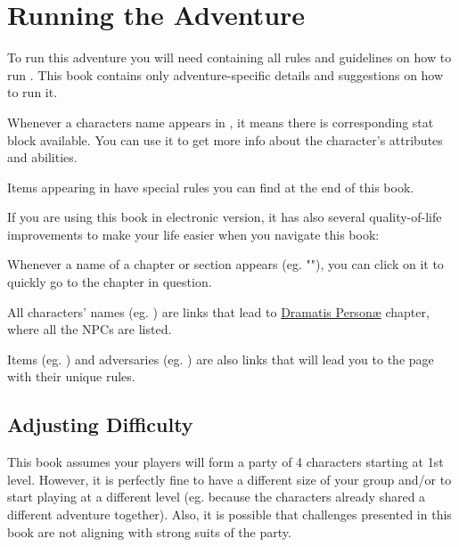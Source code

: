 \section{Running the Adventure}
\label{sec:runningAdventure}

To run this adventure you will need \handbook{} containing all rules and guidelines on how to run \cosmereRPG{}. This book contains only adventure-specific details and suggestions on how to run it.



Whenever a characters name appears in , it means there is corresponding stat block available. You can use it to get more info about the character's attributes and abilities.

Items appearing in  have special rules you can find at the end of this book.



If you are using this book in electronic version, it has also several quality-of-life improvements to make your life easier when you navigate this book:

Whenever a name of a chapter or section appears (eg. ""), you can click on it to quickly go to the chapter in question.

All characters' names (eg. \npcMedic{}) are links that lead to \hyperref[personae]{Dramatis Person\ae} chapter, where all the NPCs are listed.

Items (eg. \lootRogueShardblade{}) and adversaries (eg. \enemyDrunkenSailor{}) are also links that will lead you to the page with their unique rules. 


\subsection{Adjusting Difficulty}

This book assumes your players will form a party of 4 characters starting at 1st level. However, it is perfectly fine to have a different size of your group and/or to start playing at a different level (eg. because the characters already shared a different adventure together). Also, it is possible that challenges presented in this book are not aligning with strong suits of the party.

